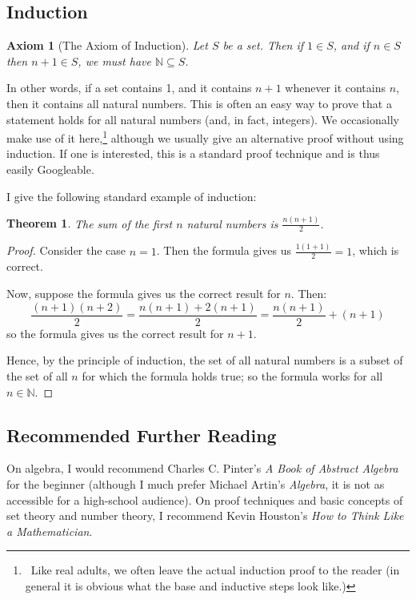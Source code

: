 \documentclass[a4paper,10pt]{article}
\newtheorem*{thm}{Theorem}
\newtheorem*{axiom}{Axiom}
\begin{document}
\subsection*{Induction}
\begin{axiom}[The Axiom of Induction]
  Let $ S $ be a set. Then if $ 1 \in S $, and if $ n \in S $ then $ n + 1 \in S $, we must have $ \mathbb{N} \subseteq S $.
\end{axiom}
In other words, if a set contains 1, and it contains $ n + 1 $ whenever it contains $ n $, then it contains all natural numbers.
This is often an easy way to prove that a statement holds for all natural numbers (and, in fact, integers). We occasionally make
use of it here,\footnote{~Like real adults, we often leave the actual induction proof to the reader (in general it is obvious
what the base and inductive steps look like.)} although we usually give an alternative proof without using induction. If one is
interested, this is a standard proof technique and is thus easily Googleable.

I give the following standard example of induction:
\begin{thm}
  The sum of the first $ n $ natural numbers is $ \frac{n(n+1)}{2} $.
\end{thm}
\begin{proof}
  Consider the case $ n = 1 $. Then the formula gives us $ \frac{1(1 + 1)}{2} = 1 $, which is correct.

  Now, suppose the formula gives us the correct result for $ n $. Then:
  \begin{displaymath}
    \frac{(n+1)(n+2)}{2} = \frac{n(n+1) +2(n + 1)}{2} = \frac{n(n+1)}{2} + (n + 1)
  \end{displaymath}
  so the formula gives us the correct result for $ n + 1 $.

  Hence, by the principle of induction, the set of all natural numbers is a subset of the set of all $ n $ for
  which the formula holds true; so the formula works for all $ n \in \mathbb{N} $.
\end{proof}

\subsection*{Recommended Further Reading}
On algebra, I would recommend Charles C. Pinter's \textit{A Book of Abstract Algebra} for the beginner (although I much
prefer Michael Artin's \textit{Algebra}, it is not as accessible for a high-school audience). On proof techniques and
basic concepts of set theory and number theory, I recommend Kevin Houston's \textit{How to Think Like a Mathematician}.
\end{document}
